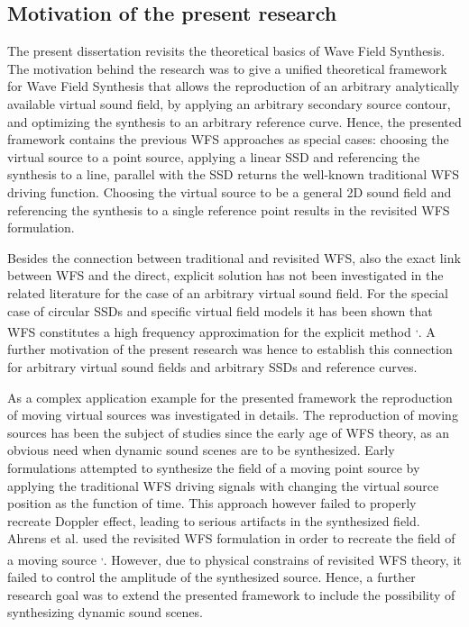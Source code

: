 \documentclass[10pt,twoside]{article}
\theoremstyle{thesisgroupstyle}
\begin{document}
\subsection{Motivation of the present research}
The present dissertation revisits the theoretical basics of Wave Field Synthesis.
The motivation behind the research was to give a unified theoretical framework for Wave Field Synthesis that allows the reproduction of an arbitrary analytically available virtual sound field, by applying an arbitrary secondary source contour, and optimizing the synthesis to an arbitrary reference curve.
Hence, the presented framework contains the previous WFS approaches as special cases: choosing the virtual source to a point source, applying a linear SSD and referencing the synthesis to a line, parallel with the SSD returns the well-known traditional WFS driving function.
Choosing the virtual source to be a general 2D sound field and referencing the synthesis to a single reference point results in the revisited WFS formulation.

Besides the connection between traditional and revisited WFS, also the exact link between WFS and the direct, explicit solution has not been investigated in the related literature for the case of an arbitrary virtual sound field.
For the special case of circular SSDs and specific virtual field models it has been shown that WFS constitutes a high frequency approximation for the explicit method \textsuperscript{,}.
A further motivation of the present research was hence to establish this connection for arbitrary virtual sound fields and arbitrary SSDs and reference curves.

As a complex application example for the presented framework the reproduction of moving virtual sources was investigated in details.
The reproduction of moving sources has been the subject of studies since the early age of WFS theory, as an obvious need when dynamic sound scenes are to be synthesized.
Early formulations attempted to synthesize the field of a moving point source by applying the traditional WFS driving signals with changing the virtual source position as the function of time.
This approach however failed to properly recreate Doppler effect, leading to serious artifacts in the synthesized field.
Ahrens et al. used the revisited WFS formulation in order to recreate the field of a moving source \textsuperscript{,}.
However, due to physical constrains of revisited WFS theory, it failed to control the amplitude of the synthesized source.
Hence, a further research goal was to extend the presented framework to include the possibility of synthesizing dynamic sound scenes.
\end{document}
